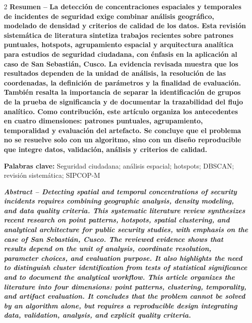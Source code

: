 \documentclass[10pt,twoside]{article}
\renewenvironment{abstract}{\noindent\textbf{Resumen -- }\bfseries\ignorespaces}{\par}
\newenvironment{englishabstract}{\par\noindent\bfseries\itshape\textbf{Abstract -- }\ignorespaces}{\par}
\newcommand{\keywords}[1]{\vspace{0.5em}\noindent\textbf{Palabras clave:} #1\par}
\begin{document}
\vspace{0.25cm}
\begin{multicols}{2}
\raggedcolumns
\begin{abstract}
La detección de concentraciones espaciales y temporales de incidentes de seguridad exige combinar análisis geográfico, modelado de densidad y criterios de calidad de los datos. Esta revisión sistemática de literatura sintetiza trabajos recientes sobre patrones puntuales, hotspots, agrupamiento espacial y arquitectura analítica para estudios de seguridad ciudadana, con énfasis en la aplicación al caso de San Sebastián, Cusco. La evidencia revisada muestra que los resultados dependen de la unidad de análisis, la resolución de las coordenadas, la definición de parámetros y la finalidad de evaluación. También resalta la importancia de separar la identificación de grupos de la prueba de significancia y de documentar la trazabilidad del flujo analítico. Como contribución, este artículo organiza los antecedentes en cuatro dimensiones: patrones puntuales, agrupamiento, temporalidad y evaluación del artefacto. Se concluye que el problema no se resuelve solo con un algoritmo, sino con un diseño reproducible que integre datos, validación, análisis y criterios de calidad.
\end{abstract}

\keywords{Seguridad ciudadana; análisis espacial; hotspots; DBSCAN; revisión sistemática; SIPCOP-M}

\begin{englishabstract}
Detecting spatial and temporal concentrations of security incidents requires combining geographic analysis, density modeling, and data quality criteria. This systematic literature review synthesizes recent research on point patterns, hotspots, spatial clustering, and analytical architecture for public security studies, with emphasis on the case of San Sebastián, Cusco. The reviewed evidence shows that results depend on the unit of analysis, coordinate resolution, parameter choices, and evaluation purpose. It also highlights the need to distinguish cluster identification from tests of statistical significance and to document the analytical workflow. This article organizes the literature into four dimensions: point patterns, clustering, temporality, and artifact evaluation. It concludes that the problem cannot be solved by an algorithm alone, but requires a reproducible design integrating data, validation, analysis, and explicit quality criteria.
\end{englishabstract}


\end{multicols}
\end{document}
